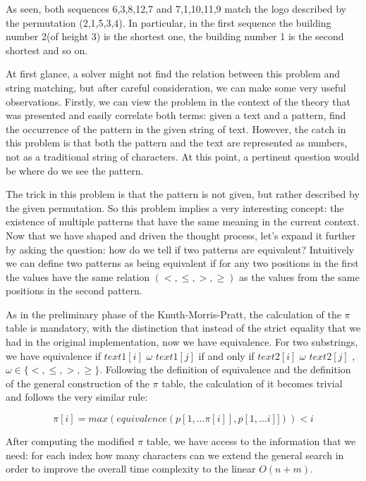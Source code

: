 \documentclass[letterpaper]{article}
\begin{document}
As seen, both sequences 6,3,8,12,7 and 7,1,10,11,9 match the logo described by the permutation (2,1,5,3,4). In particular, in the first sequence the building number 2(of height 3) is the shortest one, the building number 1 is the second shortest and so on.

At first glance, a solver might not find the relation between this problem and string matching, but after careful consideration, we can make some very useful observations. Firstly, we can view the problem in the context of the theory that was presented and easily correlate both terms: given a text and a pattern, find the occurrence of the pattern in the given string of text. However, the catch in this problem is that both the pattern and the text are represented as numbers, not as a traditional string of characters. At this point, a pertinent question would be where do we see the pattern. 

The trick in this problem is that the pattern is not given, but rather described by the given permutation. So this problem implies a very interesting concept: the existence of multiple patterns that have the same meaning in the current context. Now that we have shaped and driven the thought process, let's expand it further by asking the question: how do we tell if two patterns are equivalent? Intuitively we can define two patterns as being equivalent if for any two positions in the first the values have the same relation $(<, \leq, >, \geq )$ as the values from the same positions in the second pattern. 

As in the preliminary phase of the Knuth-Morris-Pratt, the calculation of the $\pi$ table is mandatory, with the distinction that instead of the strict equality that we had in the original implementation, now we have equivalence. For two substrings, we have equivalence if $text1[i]$ $\omega$ $text1[j]$ if and only if $text2[i]$ $\omega$ $text2[j]$ , $\omega \in \{ <, \leq, >, \geq  \}$. Following the definition of equivalence and the definition of the general construction of the $\pi$ table, the calculation of it becomes trivial and follows the very similar rule:


$$
    \pi[i]=max(equivalence(p[1,\dots \pi[i]],p[1,\dots i]])) < i
$$

After computing the modified $\pi$ table, we have access to the information that we need: for each index how many characters can we extend the general search in order to improve the overall time complexity to the linear $O(n + m)$.

\newpage
\end{document}
